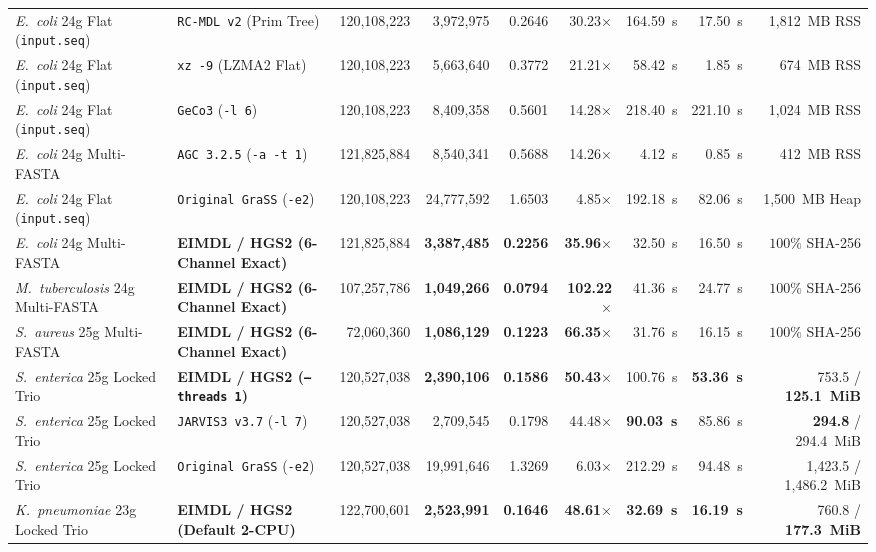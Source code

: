 \documentclass[10pt]{article}
\theoremstyle{definition}
\begin{document}
\begin{table}[h!]
{\begin{tabular}{llrrrrrrr}
\textit{E.~coli} 24g Flat (\texttt{input.seq}) & \texttt{RC-MDL v2} (Prim Tree) & 120,108,223 & 3,972,975 & 0.2646 & 30.23$\times$ & 164.59~s & 17.50~s & 1,812~MB RSS \\
\textit{E.~coli} 24g Flat (\texttt{input.seq}) & \texttt{xz -9} (LZMA2 Flat) & 120,108,223 & 5,663,640 & 0.3772 & 21.21$\times$ & 58.42~s & 1.85~s & 674~MB RSS \\
\textit{E.~coli} 24g Flat (\texttt{input.seq}) & \texttt{GeCo3} (\texttt{-l 6}) & 120,108,223 & 8,409,358 & 0.5601 & 14.28$\times$ & 218.40~s & 221.10~s & 1,024~MB RSS \\
\textit{E.~coli} 24g Multi-FASTA & \texttt{AGC 3.2.5} (\texttt{-a -t 1}) & 121,825,884 & 8,540,341 & 0.5688 & 14.26$\times$ & 4.12~s & 0.85~s & 412~MB RSS \\
\textit{E.~coli} 24g Flat (\texttt{input.seq}) & \texttt{Original GraSS} (\texttt{-e2}) & 120,108,223 & 24,777,592 & 1.6503 & 4.85$\times$ & 192.18~s & 82.06~s & 1,500~MB Heap \\
\midrule
\textit{E.~coli} 24g Multi-FASTA & \textbf{EIMDL / HGS2 (6-Channel Exact)} & 121,825,884 & \textbf{3,387,485} & \textbf{0.2256} & \textbf{35.96$\times$} & 32.50~s & 16.50~s & $100\%$ SHA-256 \\
\textit{M.~tuberculosis} 24g Multi-FASTA & \textbf{EIMDL / HGS2 (6-Channel Exact)} & 107,257,786 & \textbf{1,049,266} & \textbf{0.0794} & \textbf{102.22$\times$} & 41.36~s & 24.77~s & $100\%$ SHA-256 \\
\textit{S.~aureus} 25g Multi-FASTA & \textbf{EIMDL / HGS2 (6-Channel Exact)} & 72,060,360 & \textbf{1,086,129} & \textbf{0.1223} & \textbf{66.35$\times$} & 31.76~s & 16.15~s & $100\%$ SHA-256 \\
\midrule
\textit{S.~enterica} 25g Locked Trio & \textbf{EIMDL / HGS2 (\texttt{--threads 1})} & 120,527,038 & \textbf{2,390,106} & \textbf{0.1586} & \textbf{50.43$\times$} & 100.76~s & \textbf{53.36~s} & 753.5 / \textbf{125.1~MiB} \\
\textit{S.~enterica} 25g Locked Trio & \texttt{JARVIS3 v3.7} (\texttt{-l 7}) & 120,527,038 & 2,709,545 & 0.1798 & 44.48$\times$ & \textbf{90.03~s} & 85.86~s & \textbf{294.8} / 294.4~MiB \\
\textit{S.~enterica} 25g Locked Trio & \texttt{Original GraSS} (\texttt{-e2}) & 120,527,038 & 19,991,646 & 1.3269 & 6.03$\times$ & 212.29~s & 94.48~s & 1,423.5 / 1,486.2~MiB \\
\midrule
\textit{K.~pneumoniae} 23g Locked Trio & \textbf{EIMDL / HGS2 (Default 2-CPU)} & 122,700,601 & \textbf{2,523,991} & \textbf{0.1646} & \textbf{48.61$\times$} & \textbf{32.69~s} & \textbf{16.19~s} & 760.8 / \textbf{177.3~MiB} \\

\end{tabular}}
\end{table}
\end{document}
